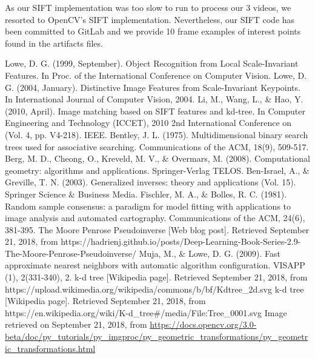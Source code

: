 \documentclass[]{IEEEtran}
\begin{document}
As our SIFT implementation was too slow to run to process our 3 videos, we resorted to OpenCV's SIFT implementation. Nevertheless, our SIFT code has been committed to GitLab and we provide 10 frame examples of interest points found in the artifacts files.

\begin{thebibliography}{00}
     Lowe, D. G. (1999, September). Object Recognition from Local Scale-Invariant Features. In Proc. of the International Conference on Computer Vision.
     Lowe, D. G. (2004, January). Distinctive Image Features from Scale-Invariant Keypoints. In International Journal of Computer Vision, 2004.
     Li, M., Wang, L., \& Hao, Y. (2010, April). Image matching based on SIFT features and kd-tree. In Computer Engineering and Technology (ICCET), 2010 2nd International Conference on (Vol. 4, pp. V4-218). IEEE.
     Bentley, J. L. (1975). Multidimensional binary search trees used for associative searching. Communications of the ACM, 18(9), 509-517.
     Berg, M. D., Cheong, O., Kreveld, M. V., \& Overmars, M. (2008). Computational geometry: algorithms and applications. Springer-Verlag TELOS.
     Ben-Israel, A., \& Greville, T. N. (2003). Generalized inverses: theory and applications (Vol. 15). Springer Science \& Business Media.
     Fischler, M. A., \& Bolles, R. C. (1981). Random sample consensus: a paradigm for model fitting with applications to image analysis and automated cartography. Communications of the ACM, 24(6), 381-395.
     The Moore Penrose Pseudoinverse [Web blog post]. Retrieved
        September 21, 2018, from
        https://hadrienj.github.io/posts/Deep-Learning-Book-Series-2.9-The-Moore-Penrose-Pseudoinverse/
     Muja, M., \& Lowe, D. G. (2009). Fast approximate nearest neighbors with automatic algorithm configuration. VISAPP (1), 2(331-340), 2.
     k-d tree [Wikipedia page]. Retrieved
        September 21, 2018, from
        https://upload.wikimedia.org/wikipedia/commons/b/bf/Kdtree\_2d.svg
     k-d tree [Wikipedia page]. Retrieved
        September 21, 2018, from
        https://en.wikipedia.org/wiki/K-d\_tree\#/media/File:Tree\_0001.svg
     Image retrieved on September 21, 2018, from \url{https://docs.opencv.org/3.0-beta/doc/py_tutorials/py_imgproc/py_geometric_transformations/py_geometric_transformations.html}
\end{thebibliography}
\end{document}
